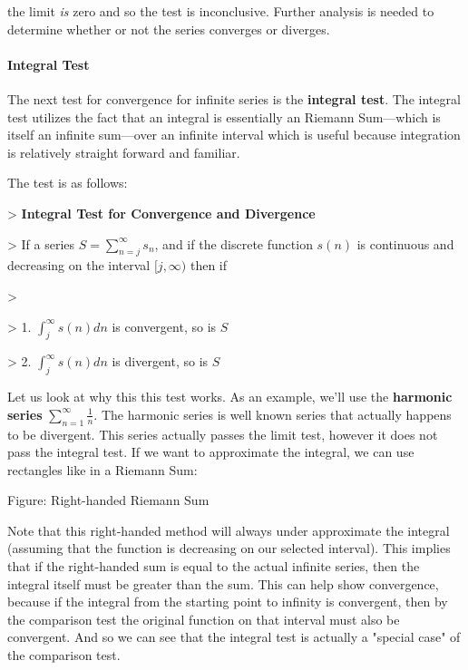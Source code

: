 the limit \textit{is} zero and so the test is inconclusive. Further analysis is needed to determine whether or not the series converges or diverges.



\paragraph{Integral Test}



The next test for convergence for infinite series is the \textbf{integral test}. The integral test utilizes the fact that an integral is essentially an Riemann Sum---which is itself an infinite sum---over an infinite interval which is useful because integration is relatively straight forward and familiar.



The test is as follows:



> \textbf{Integral Test for Convergence and Divergence}

> If a series $S= \sum _{n=j}^{\infty}{s _n}$, and if the discrete function $s(n)$ is continuous and decreasing on the interval $[j, \infty)$ then if

>

> 1.  $\int _{j}^{\infty}{s(n)dn}$ is convergent, so is $S$

> 2.  $\int _{j}^{\infty}{s(n)dn}$ is divergent, so is $S$



Let us look at why this this test works. As an example, we'll use the \textbf{harmonic series} $\sum _{n=1}^{\infty}{\frac{1}{n}}$. The harmonic series is well known series that actually happens to be divergent. This series actually passes the limit test, however it does not pass the integral test. If we want to approximate the integral, we can use rectangles like in a Riemann Sum:






Figure: Right-handed Riemann Sum



Note that this right-handed method will always under approximate the integral (assuming that the function is decreasing on our selected interval). This implies that if the right-handed sum is equal to the actual infinite series, then the integral itself must be greater than the sum. This can help show convergence, because if the integral from the starting point to infinity is convergent, then by the comparison test the original function on that interval must also be convergent. And so we can see that the integral test is actually a "special case" of the comparison test.



